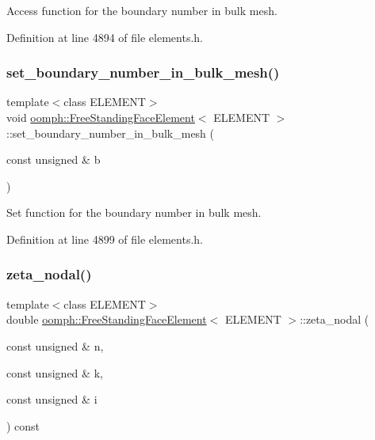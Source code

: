 Access function for the boundary number in bulk mesh. 



Definition at line 4894 of file elements.\+h.

\mbox{\label{classoomph_1_1FreeStandingFaceElement_a6b91f7a2dfd03a0df308ab3d8730d7db}} 
\subsubsection{\texorpdfstring{set\+\_\+boundary\+\_\+number\+\_\+in\+\_\+bulk\+\_\+mesh()}{set\_boundary\_number\_in\_bulk\_mesh()}}
{\footnotesize\ttfamily template$<$class E\+L\+E\+M\+E\+NT$>$ \\
void \hyperlink{classoomph_1_1FreeStandingFaceElement}{oomph\+::\+Free\+Standing\+Face\+Element}$<$ E\+L\+E\+M\+E\+NT $>$\+::set\+\_\+boundary\+\_\+number\+\_\+in\+\_\+bulk\+\_\+mesh (\begin{DoxyParamCaption}\item[{const unsigned \&}]{b }\end{DoxyParamCaption})\hspace{0.3cm}{\ttfamily [inline]}}



Set function for the boundary number in bulk mesh. 



Definition at line 4899 of file elements.\+h.

\mbox{\label{classoomph_1_1FreeStandingFaceElement_ad566632e00ef3ad2d02d824e63a3dc0e}} 
\subsubsection{\texorpdfstring{zeta\+\_\+nodal()}{zeta\_nodal()}}
{\footnotesize\ttfamily template$<$class E\+L\+E\+M\+E\+NT$>$ \\
double \hyperlink{classoomph_1_1FreeStandingFaceElement}{oomph\+::\+Free\+Standing\+Face\+Element}$<$ E\+L\+E\+M\+E\+NT $>$\+::zeta\+\_\+nodal (\begin{DoxyParamCaption}\item[{const unsigned \&}]{n,  }\item[{const unsigned \&}]{k,  }\item[{const unsigned \&}]{i }\end{DoxyParamCaption}) const\hspace{0.3cm}{\ttfamily [inline]}}



